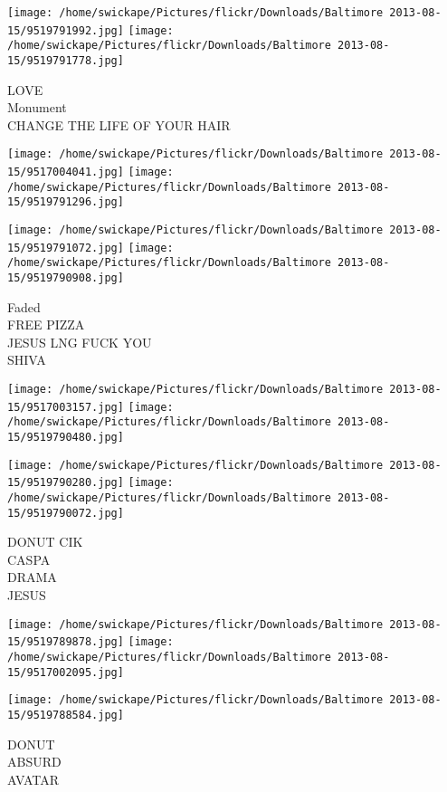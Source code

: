 \documentclass[10pt,letterpaper]{article}
\begin{document}
\vspace{0.25in}
\texttt{[image: /home/swickape/Pictures/flickr/Downloads/Baltimore 2013-08-15/9519791992.jpg]}
\texttt{[image: /home/swickape/Pictures/flickr/Downloads/Baltimore 2013-08-15/9519791778.jpg]}

LOVE\\
Monument\\
CHANGE THE LIFE OF YOUR HAIR
\pagebreak

\texttt{[image: /home/swickape/Pictures/flickr/Downloads/Baltimore 2013-08-15/9517004041.jpg]}
\texttt{[image: /home/swickape/Pictures/flickr/Downloads/Baltimore 2013-08-15/9519791296.jpg]}

\texttt{[image: /home/swickape/Pictures/flickr/Downloads/Baltimore 2013-08-15/9519791072.jpg]}
\texttt{[image: /home/swickape/Pictures/flickr/Downloads/Baltimore 2013-08-15/9519790908.jpg]}

Faded\\
FREE PIZZA\\
JESUS LNG FUCK YOU\\
SHIVA
\pagebreak

\texttt{[image: /home/swickape/Pictures/flickr/Downloads/Baltimore 2013-08-15/9517003157.jpg]}
\texttt{[image: /home/swickape/Pictures/flickr/Downloads/Baltimore 2013-08-15/9519790480.jpg]}

\texttt{[image: /home/swickape/Pictures/flickr/Downloads/Baltimore 2013-08-15/9519790280.jpg]}
\texttt{[image: /home/swickape/Pictures/flickr/Downloads/Baltimore 2013-08-15/9519790072.jpg]}

DONUT CIK\\
CASPA\\
DRAMA\\
JESUS
\pagebreak

\texttt{[image: /home/swickape/Pictures/flickr/Downloads/Baltimore 2013-08-15/9519789878.jpg]}
\texttt{[image: /home/swickape/Pictures/flickr/Downloads/Baltimore 2013-08-15/9517002095.jpg]}

\texttt{[image: /home/swickape/Pictures/flickr/Downloads/Baltimore 2013-08-15/9519788584.jpg]}

DONUT\\
ABSURD\\
AVATAR
\pagebreak
\end{document}
